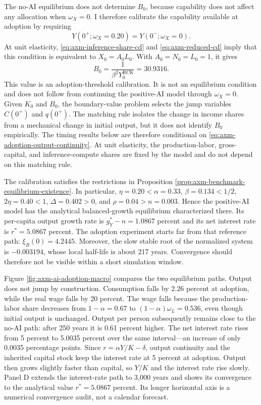 The no-AI equilibrium does not determine \(B_0\), because capability does not
affect any allocation when \(\omega_X=0\). I therefore calibrate the capability
available at adoption by requiring
\begin{equation}
 Y(0^+;\omega_X=0.20)=Y(0^-;\omega_X=0).
 \label{eq:axm-adoption-output-continuity}
\end{equation}
At unit elasticity, \eqref{eq:axm-inference-share-cd} and
\eqref{eq:axm-reduced-cd} imply that this condition is equivalent to
\(X_0=A_0L_0\). With \(A_0=N_0=L_0=1\), it gives
\begin{equation}
 B_0=\frac{1}{\beta^2Y_0^{\mathrm{RCK}}}=30.9316.
 \label{eq:axm-adoption-initial-capability}
\end{equation}
This value is an adoption-threshold calibration. It is not an equilibrium
condition and does not follow from continuing the positive-AI model through
\(\omega_X=0\). Given \(K_0\) and \(B_0\), the boundary-value problem selects
the jump variables \(C(0^+)\) and \(q(0^+)\). The matching rule isolates the
change in income shares from a mechanical change in initial output, but it does
not identify \(B_0\) empirically. The timing results below are therefore
conditional on \eqref{eq:axm-adoption-output-continuity}. At unit elasticity,
the production-labor, gross-capital, and inference-compute shares are fixed by
the model and do not depend on this matching rule.

The calibration satisfies the restrictions in Proposition
\ref{prop:axm-benchmark-equilibrium-existence}. In particular,
\(\eta=0.20<\alpha=0.33\), \(\beta=0.134<1/2\), \(2\eta=0.40<1\),
\(\Delta=0.402>0\), and \(\rho=0.04>n=0.003\). Hence the positive-AI model
has the analytical balanced-growth equilibrium characterized there. Its
per-capita output growth rate is \(g_Y^*-n=1.0867\) percent and its net
interest rate is \(r^*=5.0867\) percent. The adoption experiment starts far
from that reference path: \(\xi_B(0)=4.2445\). Moreover, the slow stable root
of the normalized system is \(-0.003194\), whose local half-life is about 217
years. Convergence should therefore not be visible within a short simulation
window.

Figure \ref{fig:axm-ai-adoption-macro} compares the two equilibrium paths.
Output does not jump by construction. Consumption falls by 2.26 percent at
adoption, while the real wage falls by 20 percent. The wage falls because the
production-labor share decreases from \(1-\alpha=0.67\) to
\((1-\alpha)\omega_L=0.536\), even though initial output is unchanged. Output
per person subsequently remains close to the no-AI path: after 250 years it is
0.61 percent higher. The net interest rate rises from 5 percent to 5.0035
percent over the same interval---an increase of only 0.0035 percentage points.
Since \(r=\alpha Y/K-\delta\), output continuity and the inherited capital
stock keep the interest rate at 5 percent at adoption. Output then grows
slightly faster than capital, so \(Y/K\) and the interest rate rise slowly.
Panel D extends the interest-rate path to 3,000 years and shows its convergence
to the analytical value \(r^*=5.0867\) percent. Its longer horizontal axis is a
numerical convergence audit, not a calendar forecast.

